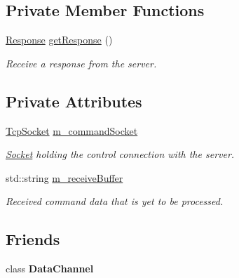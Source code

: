 \subsection*{Private Member Functions}
\begin{DoxyCompactItemize}
\item 
\mbox{\hyperlink{classsf_1_1_ftp_1_1_response}{Response}} \mbox{\hyperlink{classsf_1_1_ftp_a605a3ecae3bbba58fd1f250be500e741}{get\+Response}} ()
\begin{DoxyCompactList}\small\item\em Receive a response from the server. \end{DoxyCompactList}\end{DoxyCompactItemize}
\subsection*{Private Attributes}
\begin{DoxyCompactItemize}
\item 
\mbox{\label{classsf_1_1_ftp_a36e68897d2219b1a56f1c30545bc6cce}} 
\mbox{\hyperlink{classsf_1_1_tcp_socket}{Tcp\+Socket}} \mbox{\hyperlink{classsf_1_1_ftp_a36e68897d2219b1a56f1c30545bc6cce}{m\+\_\+command\+Socket}}
\begin{DoxyCompactList}\small\item\em \mbox{\hyperlink{classsf_1_1_socket}{Socket}} holding the control connection with the server. \end{DoxyCompactList}\item 
\mbox{\label{classsf_1_1_ftp_a24e8c6bd093823fb24caab23f9c798a0}} 
std\+::string \mbox{\hyperlink{classsf_1_1_ftp_a24e8c6bd093823fb24caab23f9c798a0}{m\+\_\+receive\+Buffer}}
\begin{DoxyCompactList}\small\item\em Received command data that is yet to be processed. \end{DoxyCompactList}\end{DoxyCompactItemize}
\subsection*{Friends}
\begin{DoxyCompactItemize}
\item 
\mbox{\label{classsf_1_1_ftp_a8dee57337b6a7e183bfe21d178757b0c}} 
class {\bfseries Data\+Channel}
\end{DoxyCompactItemize}


